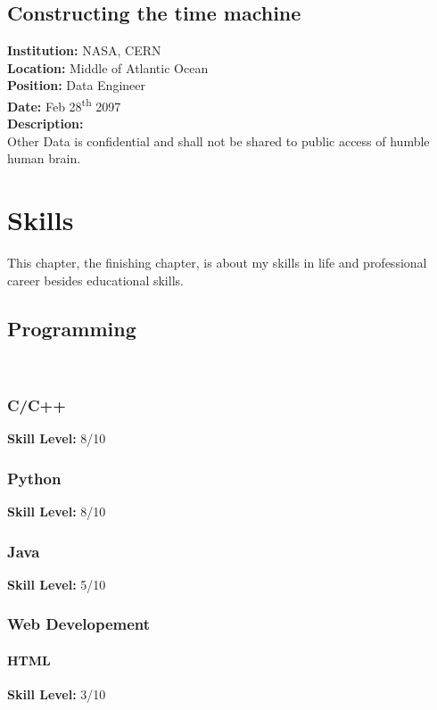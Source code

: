 \documentclass[12pt,a4paper]{report}
\begin{document}
\section{Constructing the time machine}
{\textbf {Institution:}} NASA, CERN\\
{\textbf {Location:}} Middle of Atlantic Ocean\\
{\textbf {Position:}} Data Engineer\\
{\textbf {Date:}} Feb 28\textsuperscript{th} 2097\\
{\textbf {Description:}} \\
\lipsum[6]
Other Data is confidential and shall not be shared to public access of humble human brain.

\chapter{Skills}

This chapter, the finishing chapter, is about my skills in life and professional career besides educational skills.

\section{Programming}
\lipsum[7] \\

\subsection{C/C++}
{\textbf {Skill Level:}} 8/10 \\
\lipsum[8]

\subsection{Python}
{\textbf {Skill Level:}} 8/10 \\
\lipsum[9]

\subsection{Java}
{\textbf {Skill Level:}} 5/10 \\
\lipsum[10]

\subsection{Web Developement}

\subsubsection{HTML}
{\textbf {Skill Level:}} 3/10 \\
\lipsum[11]
\end{document}
